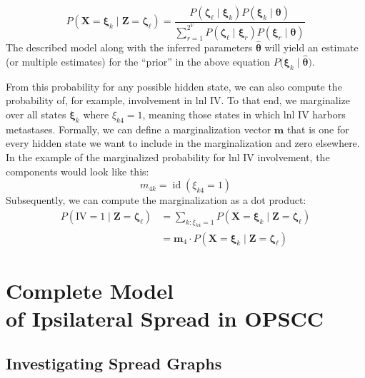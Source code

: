 \documentclass[twocolumn]{article}
\begin{document}
\begin{equation}
    P\left( \mathbf{X}=\boldsymbol{\xi}_k \mid \mathbf{Z}=\boldsymbol{\zeta}_\ell \right) = \frac{P\left( \boldsymbol{\zeta}_\ell \mid \boldsymbol{\xi}_k \right) P\left( \boldsymbol{\xi}_k \mid \boldsymbol{\theta} \right)}{\sum_{r=1}^{2^V} P\left( \boldsymbol{\zeta}_\ell \mid \boldsymbol{\xi}_r \right) P\left( \boldsymbol{\xi}_r \mid \boldsymbol{\theta} \right) }
\end{equation}
%
The described model along with the inferred parameters $\boldsymbol{\hat{\theta}}$ will yield an estimate (or multiple estimates) for the ``prior'' in the above equation $P\big( \boldsymbol{\xi}_k \mid \boldsymbol{\hat{\theta}} \big)$.

From this probability for any possible hidden state, we can also compute the probability of, for example, involvement in \gls{lnl} IV. To that end, we marginalize over all states $\boldsymbol{\xi}_k$ where $\xi_{k4} = 1$, meaning those states in which \gls{lnl} IV harbors metastases. Formally, we can define a marginalization vector $\mathbf{m}$ that is one for every hidden state we want to include in the marginalization and zero elsewhere. In the example of the marginalized probability for \gls{lnl} IV involvement, the components would look like this:
%
\begin{equation}
    m_{4k} = \operatorname{id}(\xi_{k4} = 1)
\end{equation}
%
Subsequently, we can compute the marginalization as a dot product:
%
\begin{equation}
    \begin{aligned}
        P\left(\text{IV} = 1 \mid \mathbf{Z}=\boldsymbol{\zeta}_\ell \right) &= \sum_{k:\xi_{k4} = 1} P\left( \mathbf{X}=\boldsymbol{\xi}_k \mid \mathbf{Z}=\boldsymbol{\zeta}_\ell \right) \\
        &= \mathbf{m}_4 \cdot P\left( \mathbf{X}=\boldsymbol{\xi}_k \mid \mathbf{Z}=\boldsymbol{\zeta}_\ell \right)
    \end{aligned}
\end{equation}


\section{Complete Model\\of Ipsilateral Spread in OPSCC}
\label{sec:complete_model}

\subsection{Investigating Spread Graphs}
\label{subsec:complete_model:graphs}
\end{document}
